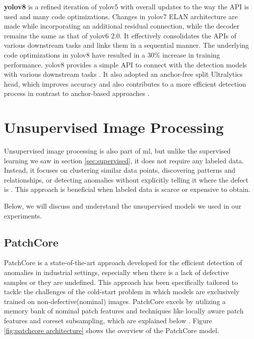 \textbf{\gls{yolo}v8} \cite{ultralytics2024yolov8} is a refined iteration of \gls{yolo}v5 with overall updates to the way the API is used and many code optimizations. Changes in \gls{yolo}v7 ELAN architecture are made while incorporating an additional residual connection, while the decoder remains the same as that of \gls{yolo}v6 2.0. It effectively consolidates the APIs of various downstream tasks and links them in a sequential manner. The underlying code optimizations in \gls{yolo}v8 have resulted in a 30\% increase in training performance. \gls{yolo}v8 provides a simple API to connect with the detection models with various downstream tasks \cite{wang2024yolov1}. It also adopted an anchor-free split Ultralytics head, which improves accuracy and also contributes to a more efficient detection process in contrast to anchor-based approaches \cite{ultralytics2024yolov6}.

\section{Unsupervised Image Processing}
\label{sec:unsupervised image processing}

Unsupervised image processing is also part of \gls{ml}, but unlike the supervised learning we saw in section \ref{sec:supervised}, it does not require any labeled data. Instead, it focuses on clustering similar data points, discovering patterns and relationships, or detecting anomalies without explicitly telling it where the defect is \cite{geeksforgeeks-sup-unsup}. This approach is beneficial when labeled data is scarce or expensive to obtain.

Below, we will discuss and understand the unsupervised models we used in our experiments.


\subsection{PatchCore}
\label{subsec:patchcore}

PatchCore is a state-of-the-art approach developed for the efficient detection of anomalies in industrial settings, especially when there is a lack of defective samples or they are undefined. This approach has been specifically tailored to tackle the challenges of the cold-start problem in which models are exclusively trained on non-defective(nominal) images. PatchCore excels by utilizing a memory bank of nominal patch features and techniques like locally aware patch features and coreset subsampling, which are explained below \cite{roth2022totalrecallindustrialanomaly}. Figure \ref{fig:patchcore architecture} shows the overview of the PatchCore model.

